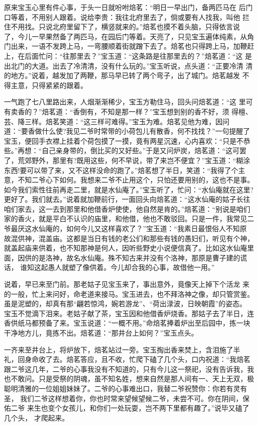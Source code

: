 原来宝玉心里有件心事，于头一日就吩咐焙茗：“明日一早出门，备两匹马在
后门口等着，不用别人跟着。说给李贵：我往北府里去了，倘或要有人找我，叫他
拦住不用找。只说北府里留下了，横竖就来的。”焙茗也摸不着头脑，只得依言说
了，今儿一早果然备了两匹马，在园后门等着。天亮了，只见宝玉遍体纯素，从角
门出来，一语不发跨上马，一弯腰顺着街就蹭下去了。焙茗也只得跨上马，加鞭赶
上，在后面忙问：“往那里去？”宝玉道：“这条路是往那里去的？”焙茗道：“这
是出北门的大道。出去了冷清清，没有什么玩的。”宝玉听说，点头道：“正要冷清
清的地方。”说着，越发加了两鞭，那马早已转了两个弯子，出了城门。焙茗越发
不得主意，只得紧紧的跟着。

一气跑了七八里路出来，人烟渐渐稀少，宝玉方勒住马，回头问焙茗道：“这
里可有卖香的？”焙茗道：“香倒有，不知是那一样？”宝玉想到别的香不好，须
得檀、芸、降三样。焙茗笑道：“这三样可难得。”宝玉为难。焙茗见他为难，因问
道：“要香做什么使?我见二爷时常带的小荷包儿有散香，何不找找？”一句提醒了
宝玉，便回手衣襟上挂着个荷包摸了一摸，竟有两星沉速，心内喜欢：“只是不恭
些。”再想：“自己亲身带的，倒比买的又好些。”于是又问炉炭，焙茗道：“这可罢
了，荒郊野外，那里有?既用这些，何不早说，带了来岂不便宜？”宝玉道：“糊涂
东西!要可以带了来，又不这样没命的跑了。”焙茗想了半日，笑道：“我得了个主
意，不知二爷心下如何。我想来二爷不止用这个，只怕还要用别的，这也不是事。
如今我们索性往前再走二里，就是水仙庵了。”宝玉听了，忙问：“水仙庵就在这里?
更好了。我们就去。”说着就加鞭前行，一面回头向焙茗道：“这水仙庵的姑子长往
咱们家去，这一去到那里和他借香炉使使，他自然是肯的。”焙茗道：“别说是咱们
家的香火，就是平白不认识的庙里，和他借，他也不敢驳回。只是一件，我常见二
爷最厌这水仙庵的，如何今儿又这样喜欢了？”宝玉道：“我素日最恨俗人不知原
故混供神，混盖庙。这都是当日有钱的老公们和那些有钱的愚妇们，听见有个神，
就盖起庙来供着，也不知那神是何人，因听些野史小说便信真了。比如这水仙庵里
面，因供的是洛神，故名水仙庵。殊不知古来并没有个洛神，那原是曹子建的谎话，
谁知这起愚人就塑了像供着。今儿却合我的心事，故借他一用。”

说着，早已来至门前。那老姑子见宝玉来了，事出意外，竟像天上掉下个活龙
来的一般，忙上来问好，命老道来接马。宝玉进去，也不拜洛神之像，却只管赏鉴。
虽是泥塑的，却真有那“翩若惊鸿，婉若游龙”、“荷出渌波，日映朝霞”的姿态。
宝玉不觉滴下泪来。老姑子献了茶，宝玉因和他借香炉烧香。那姑子去了半日，连
香供纸马都预备了来。宝玉说道：“一概不用。”命焙茗捧着炉出至后园中，拣一块
干净地方儿，竟拣不出。焙茗道：“那井台上如何？”宝玉点头。

一齐来至井台上，将炉放下，焙茗站过一旁。宝玉掏出香来焚上，含泪施了半
礼，回身命收了去。焙茗答应，且不收，忙爬下磕了几个头，口内祝道：“我焙茗
跟二爷这几年，二爷的心事我没有不知道的，只有今儿这一祭祀，没有告诉我，我
也不敢问。只是受祭的阴魂，虽不知名姓，想来自然是那人间有一、天上无双，极
聪明清雅的一位姐姐妹妹了。二爷的心事难出口，我替二爷祝赞你：你若有灵有圣，
我们二爷这样想着你，你也时常来望候望候二爷，未尝不可。你在阴间，保佑二爷
来生也变个女孩儿，和你们一处玩耍，岂不两下里都有趣了。”说毕又磕了几个头，
才爬起来。

